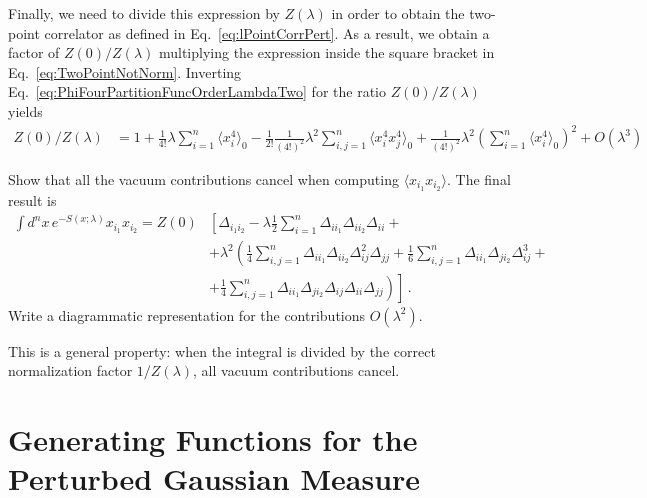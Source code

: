 \documentclass[notes.tex]{subfiles}
\begin{document}
Finally, we need to divide this expression by $Z(\lambda)$ in order to
obtain the two-point correlator as defined in
Eq.~\ref{eq:lPointCorrPert}.  As a result, we obtain a factor of
$Z(0)/Z(\lambda)$ multiplying the expression inside the square bracket
in Eq.~\ref{eq:TwoPointNotNorm}. Inverting
Eq.~\ref{eq:PhiFourPartitionFuncOrderLambdaTwo} for the ratio
$Z(0)/Z(\lambda)$ yields
\begin{align}
 Z(0)/Z(\lambda) &= 
                    1 + \frac{1}{4!} \lambda \sum_{i=1}^n \langle x_i^4\rangle_0 
                    - \frac{1}{2!} \frac{1}{(4!)^2} \lambda^2 \sum_{i,j=1}^n 
                    \langle x_i^4 x_j^4\rangle_0 
                   + \frac{1}{(4!)^2} \lambda^2 \left(\sum_{i=1}^n \langle x_i^4\rangle_0\right)^2
                   + O(\lambda^3) 
\end{align}

\begin{Ex}
  Show that all the vacuum contributions cancel when computing $\langle
  x_{i_1} x_{i_2}\rangle$. The final result is
  \begin{align}
  \int d^nx\, e^{-S(x;\lambda)} 
  x_{i_1} x_{i_2} = Z(0) & 
                           \left[
                           \Delta_{i_1 i_2} - \lambda  \frac12 \sum_{i=1}^n
                           \Delta_{i i_1} \Delta_{i i_2} \Delta_{i i} 
                            + \right. \nonumber \\
                         & \left.
                           + \lambda^2 \left( 
                           \frac{1}{4} \sum_{i,j=1}^n \Delta_{i i_1}
                           \Delta_{i i_2} \Delta_{i j}^2 \Delta_{jj}
                           + \frac{1}{6} \sum_{i,j=1}^n \Delta_{i i_1}
                           \Delta_{j i_2} \Delta_{i j}^3 +
                           \right. \right. \nonumber \\
  \label{eq:TwoPointNorm}
                         & + \left. \left.
                           \frac{1}{4} \sum_{i,j=1}^n \Delta_{i i_1}
                           \Delta_{j i_2} \Delta_{i j} \Delta_{ii}\Delta_{jj}
                           \right)
                           \right]\, .
\end{align}
Write a diagrammatic representation for the contributions $O(\lambda^2)$.
\end{Ex}
This is a general property: when the integral is divided by the
correct normalization factor $1/Z(\lambda)$, all vacuum contributions
cancel.

\section{Generating Functions for the Perturbed Gaussian Measure}
\label{sec:gener-funct-pert}
\end{document}
